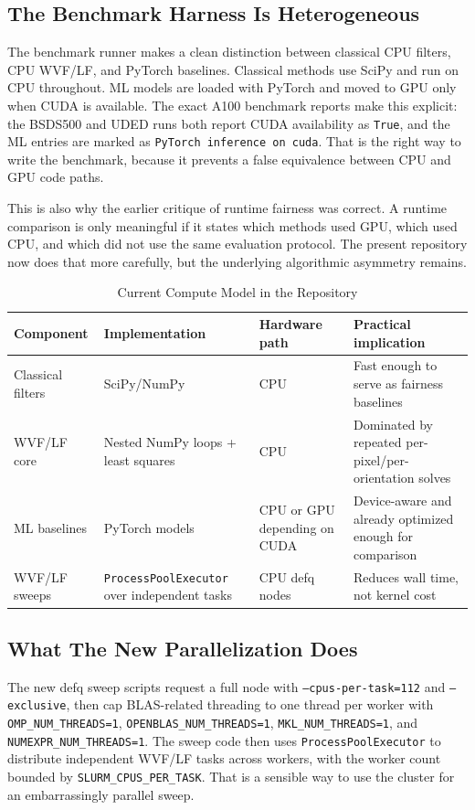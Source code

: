 \documentclass[conference]{IEEEtran}
\begin{document}
\subsection{The Benchmark Harness Is Heterogeneous}
The benchmark runner makes a clean distinction between classical CPU filters, CPU WVF/LF, and PyTorch baselines. Classical methods use SciPy and run on CPU throughout. ML models are loaded with PyTorch and moved to GPU only when CUDA is available. The exact A100 benchmark reports make this explicit: the BSDS500 and UDED runs both report CUDA availability as \texttt{True}, and the ML entries are marked as \texttt{PyTorch inference on cuda}. That is the right way to write the benchmark, because it prevents a false equivalence between CPU and GPU code paths.

This is also why the earlier critique of runtime fairness was correct. A runtime comparison is only meaningful if it states which methods used GPU, which used CPU, and which did not use the same evaluation protocol. The present repository now does that more carefully, but the underlying algorithmic asymmetry remains.

\begin{table}[t]
\centering
\caption{Current Compute Model in the Repository}
\label{tab:model}
\scriptsize
\begin{tabular}{P{2.2cm}P{2.2cm}P{2.4cm}P{2.3cm}}
\toprule
Component & Implementation & Hardware path & Practical implication \\
\midrule
Classical filters & SciPy/NumPy & CPU & Fast enough to serve as fairness baselines \\
WVF/LF core & Nested NumPy loops + least squares & CPU & Dominated by repeated per-pixel/per-orientation solves \\
ML baselines & PyTorch models & CPU or GPU depending on CUDA & Device-aware and already optimized enough for comparison \\
WVF/LF sweeps & \texttt{ProcessPoolExecutor} over independent tasks & CPU defq nodes & Reduces wall time, not kernel cost \\
\bottomrule
\end{tabular}
\end{table}

\subsection{What The New Parallelization Does}
The new defq sweep scripts request a full node with \texttt{--cpus-per-task=112} and \texttt{--exclusive}, then cap BLAS-related threading to one thread per worker with \texttt{OMP\_NUM\_THREADS=1}, \texttt{OPENBLAS\_NUM\_THREADS=1}, \texttt{MKL\_NUM\_THREADS=1}, and \texttt{NUMEXPR\_NUM\_THREADS=1}. The sweep code then uses \texttt{ProcessPoolExecutor} to distribute independent WVF/LF tasks across workers, with the worker count bounded by \texttt{SLURM\_CPUS\_PER\_TASK}. That is a sensible way to use the cluster for an embarrassingly parallel sweep.
\end{document}
